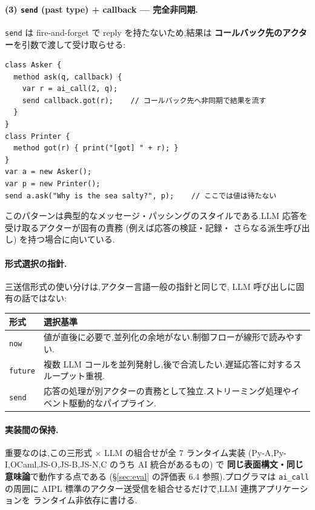 \documentclass[11pt,a4paper]{article}
\newcommand{\code}[1]{\texttt{\small #1}}
\begin{document}
\paragraph{(3) \code{send} (past type) + callback — 完全非同期.}

\code{send} は fire-and-forget で reply を持たないため,結果は
\textbf{コールバック先のアクター}を引数で渡して受け取らせる:

\begin{lstlisting}
class Asker {
  method ask(q, callback) {
    var r = ai_call(2, q);
    send callback.got(r);    // コールバック先へ非同期で結果を流す
  }
}
class Printer {
  method got(r) { print("[got] " + r); }
}
var a = new Asker();
var p = new Printer();
send a.ask("Why is the sea salty?", p);    // ここでは値は待たない
\end{lstlisting}

このパターンは典型的なメッセージ・パッシングのスタイルである.LLM
応答を受け取るアクターが固有の責務 (例えば応答の検証・記録・
さらなる派生呼び出し) を持つ場合に向いている.

\paragraph{形式選択の指針.}
三送信形式の使い分けは,アクター言語一般の指針と同じで,
LLM 呼び出しに固有の話ではない:

\begin{tabularx}{\linewidth}{l X}
  \toprule
  \textbf{形式} & \textbf{選択基準} \\
  \midrule
  \code{now}    & 値が直後に必要で,並列化の余地がない.制御フローが線形で読みやすい. \\
  \code{future} & 複数 LLM コールを並列発射し,後で合流したい.遅延応答に対するスループット重視. \\
  \code{send}   & 応答の処理が別アクターの責務として独立.ストリーミング処理やイベント駆動的なパイプライン. \\
  \bottomrule
\end{tabularx}

\paragraph{実装間の保持.}
重要なのは,この三形式 × LLM の組合せが全 7 ランタイム実装
(Py-A,Py-I,OCaml,JS-O,JS-B,JS-N,C のうち AI 統合があるもの) で
\textbf{同じ表面構文・同じ意味論}で動作する点である (\S\ref{sec:eval}
の評価表 6.4 参照).プログラマは \code{ai\_call} の周囲に AIPL
標準のアクター送受信を組合せるだけで,LLM 連携アプリケーションを
ランタイム非依存に書ける.
\end{document}
